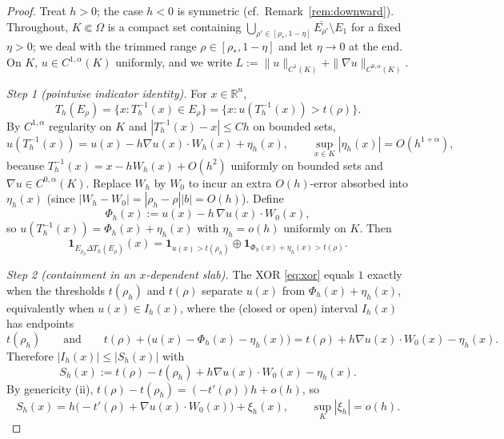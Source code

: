 \documentclass[11pt]{article}
\theoremstyle{definition}
\newcommand{\R}{\mathbb{R}}
\newcommand{\Om}{\Omega}
\newcommand{\rstar}{\rho_{*}}
\begin{document}
\begin{proof}
Treat $h>0$; the case $h<0$ is symmetric (cf.\ Remark~\ref{rem:downward}).
Throughout, $K\Subset\Om$ is a compact set containing
$\bigcup_{\rho'\in[\rstar,1-\eta]}\overline{E_{\rho'}}\setminus E_1$ for a
fixed $\eta>0$; we deal with the trimmed range $\rho\in[\rstar,1-\eta]$ and
let $\eta\to0$ at the end. On $K$, $u\in C^{1,\alpha}(K)$ uniformly, and we
write $L:=\|u\|_{C^1(K)}+\|\nabla u\|_{C^{0,\alpha}(K)}$.

\smallskip
\emph{Step 1 (pointwise indicator identity).} For $x\in\R^n$,
\[
   T_h(E_\rho)=\{x:T_h^{-1}(x)\in E_\rho\}=\{x:u(T_h^{-1}(x))>t(\rho)\}.
\]
By $C^{1,\alpha}$ regularity on $K$ and $|T_h^{-1}(x)-x|\le Ch$ on bounded
sets,
\begin{equation}\label{eq:linearization}
   u(T_h^{-1}(x))=u(x)-h\nabla u(x)\cdot W_h(x)+\eta_h(x),
   \qquad
   \sup_{x\in K}|\eta_h(x)|=O(h^{1+\alpha}),
\end{equation}
because $T_h^{-1}(x)=x-hW_h(x)+O(h^2)$ uniformly on bounded sets and
$\nabla u\in C^{0,\alpha}(K)$. Replace $W_h$ by $W_0$ to incur an extra
$O(h)$-error absorbed into $\eta_h(x)$ (since $|W_h-W_0|=|\rho_h-\rho||b|=O(h)$).
Define
\[
   \Phi_h(x):=u(x)-h\,\nabla u(x)\cdot W_0(x),
\]
so $u(T_h^{-1}(x))=\Phi_h(x)+\eta_h(x)$ with $\eta_h=o(h)$ uniformly on $K$.
Then
\begin{equation}\label{eq:xor}
   \mathbf 1_{E_{\rho_h}\Delta T_h(E_\rho)}(x)
   =\mathbf 1_{u(x)>t(\rho_h)}\oplus
    \mathbf 1_{\Phi_h(x)+\eta_h(x)>t(\rho)}.
\end{equation}

\smallskip
\emph{Step 2 (containment in an $x$-dependent slab).} The XOR
\eqref{eq:xor} equals $1$ exactly when the thresholds $t(\rho_h)$ and
$t(\rho)$ separate $u(x)$ from $\Phi_h(x)+\eta_h(x)$, equivalently when
$u(x)\in I_h(x)$, where the (closed or open) interval $I_h(x)$ has endpoints
\[
   t(\rho_h)\qquad\text{and}\qquad t(\rho)+\bigl(u(x)-\Phi_h(x)-\eta_h(x)\bigr)
   =t(\rho)+h\nabla u(x)\cdot W_0(x)-\eta_h(x).
\]
Therefore $|I_h(x)|\le|S_h(x)|$ with
\begin{equation}\label{eq:Sh}
   S_h(x):=t(\rho)-t(\rho_h)+h\nabla u(x)\cdot W_0(x)-\eta_h(x).
\end{equation}
By genericity (ii), $t(\rho)-t(\rho_h)=(-t'(\rho))h+o(h)$, so
\begin{equation}\label{eq:Sh-asymp}
   S_h(x)=h\bigl(-t'(\rho)+\nabla u(x)\cdot W_0(x)\bigr)+\xi_h(x),
   \qquad \sup_K|\xi_h|=o(h).
\end{equation}


\end{proof}
\end{document}
